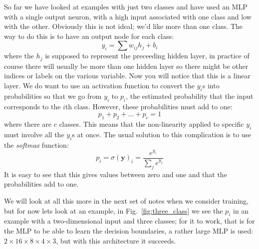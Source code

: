 \documentclass[12pt]{article}
\begin{document}
So far we have looked at examples with just two classes and have used
an MLP with a single output neuron, with a high input associated with
one class and low with the other. Obviously this is not ideal; we'd
like more than one class. The way to do this is to have an output node
for each class:
\begin{equation}
  y_i = \sum w_{ij} h_j +b_i
\end{equation}
where the $h_j$ is supposed to represent the preceeding hidden layer,
in practice of course there will usually be more than one hidden layer
so there might be other indices or labels on the various variable. Now
you will notice that this is a linear layer. We do want to use an
activation function to convert the $y_i$s into probabilities so that
we go from $y_i$ to $p_i$, the estimated probability that the input
corresponds to the $i$th class. However, these probabilities must add to one:
\begin{equation}
  p_1+p_2+\ldots+p_c=1
\end{equation}
where there are $c$ classes. This means that the non-linearity applied to specific $y_i$ must involve all the $y_i$s at once. The usual solution to this complication is to use the \textsl{softmax} function:
\begin{equation}
  p_i=\sigma(\mathbf{y})_i=\frac{e^{y_i}}{\sum_j e^{y_j}}
\end{equation}
It is easy to see that this gives values between zero and one and that
the probabilities add to one.

We will look at all this more in the next set of notes when we
consider training, but for now lets look at an example, in
Fig.~\ref{fig:three_class} we see the $p_i$ in an example with a
two-dimensional input and three classes; for it to work, that is for
the MLP to be able to learn the decision boundaries, a rather large
MLP is used: $2\times 16\times 8\times 4\times 3$, but with this architecture it succeeds.
\end{document}
